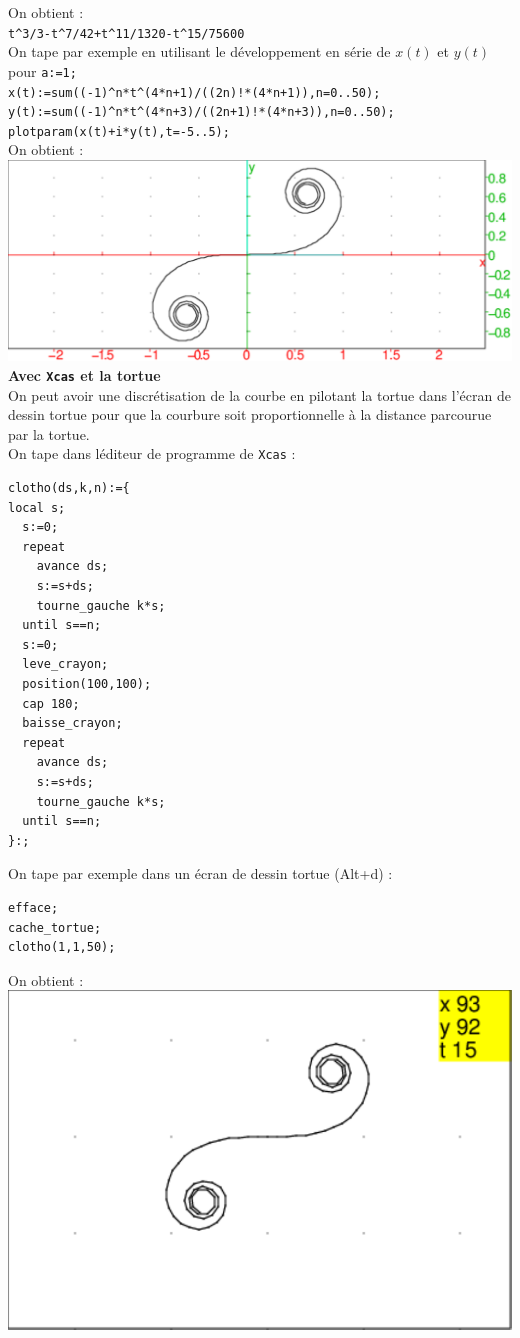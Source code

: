 \documentclass[a4paper,11pt]{book}
\begin{document}
On obtient :\\
{\tt t\verb|^|3/3-t\verb|^|7/42+t\verb|^|11/1320-t\verb|^|15/75600}\\
On tape par exemple en utilisant le d\'eveloppement en s\'erie de $x(t)$ et 
$y(t)$ pour {\tt a:=1;}\\
{\tt x(t):=sum((-1)\verb|^|n*t\verb|^|(4*n+1)/((2n)!*(4*n+1)),n=0..50);}\\
{\tt y(t):=sum((-1)\verb|^|n*t\verb|^|(4*n+3)/((2n+1)!*(4*n+3)),n=0..50);}\\
{\tt plotparam(x(t)+i*y(t),t=-5..5);}\\
On obtient :\\
\includegraphics[width=\textwidth]{spiralclotho1}
{\bf Avec {\tt Xcas} et la tortue}\\
On peut avoir une discr\'etisation de la courbe en pilotant la tortue dans 
l'\'ecran de dessin tortue pour que la courbure soit proportionnelle \`a la 
distance parcourue par la tortue.\\
On tape dans l\'editeur de programme de {\tt Xcas} :
\begin{verbatim}
clotho(ds,k,n):={
local s;
  s:=0;
  repeat 
    avance ds; 
    s:=s+ds; 
    tourne_gauche k*s;
  until s==n;
  s:=0;
  leve_crayon;
  position(100,100);
  cap 180;
  baisse_crayon;
  repeat 
    avance ds; 
    s:=s+ds; 
    tourne_gauche k*s;
  until s==n;
}:;
\end{verbatim}
On tape par exemple dans un \'ecran de dessin tortue (Alt+d) :
\begin{verbatim}
efface;
cache_tortue;
clotho(1,1,50);
\end{verbatim}
On obtient : \\
\includegraphics[width=\textwidth]{spiralclotho}\\
\end{document}
